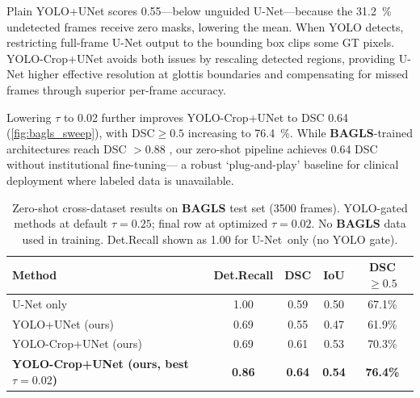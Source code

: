 \documentclass[preprint,12pt]{elsarticle}
\newcommand{\bagls}{\textbf{BAGLS}}
\newcommand{\yolounet}{YOLO+UNet}
\newcommand{\yolocrop}{YOLO-Crop+UNet}
\begin{document}
Plain \yolounet{} scores \num{0.55}---below unguided U-Net---because the \SI{31.2}{\%} 
undetected frames receive zero masks, lowering the mean.
When YOLO detects, restricting full-frame U-Net output to the bounding box clips some GT pixels.
\yolocrop{} avoids both issues by rescaling detected regions, providing U-Net higher 
effective resolution at glottis boundaries and compensating for missed frames through 
superior per-frame accuracy.

Lowering $\tau$ to 0.02 further improves \yolocrop{} to DSC \num{0.64} 
(\cref{fig:bagls_sweep}), with DSC${\geq}0.5$ increasing to \SI{76.4}{\%}.
While \bagls{}-trained architectures reach DSC $>$\num{0.88} \cite{montalbo2024}, 
our zero-shot pipeline achieves \num{0.64} DSC without institutional fine-tuning---
a robust `plug-and-play' baseline for clinical deployment where labeled data is unavailable.


\begin{table}[t]
\centering
\caption{Zero-shot cross-dataset results on \bagls{} test set
  (\num{3500} frames). YOLO-gated methods at default $\tau{=}0.25$; final row
  at optimized $\tau{=}0.02$. No \bagls{} data used in training.
  Det.Recall shown as 1.00 for U-Net~only (no YOLO gate).}
\label{tab:bagls}
\small
\setlength{\tabcolsep}{4pt}
\begin{tabular}{lcccc}
\toprule
Method & Det.Recall & DSC & IoU & DSC${\geq}0.5$ \\
\midrule
U-Net only                     & 1.00 & 0.59 & 0.50 & 67.1\% \\
\yolounet{} (ours)             & 0.69 & 0.55 & 0.47 & 61.9\% \\
\yolocrop{} (ours)             & 0.69 & 0.61 & 0.53 & 70.3\% \\
\midrule
\textbf{\yolocrop{} (ours, best $\tau{=}0.02$)} & \textbf{0.86} & \textbf{0.64} & \textbf{0.54} & \textbf{76.4\%} \\
\bottomrule
\end{tabular}
\end{table}
\end{document}
